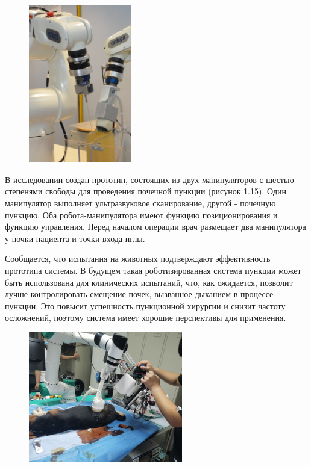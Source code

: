 \begin{figure}[!h]
\begin{center}
\includegraphics[width=0.4\textwidth]{Рисунки/аналог3.png}
\caption{\centering {}}
\label{част}
\end{center}
\end{figure}

В исследовании \cite{litlink42} создан прототип, состоящих из двух манипуляторов с шестью степенями свободы для проведения почечной пункции (рисунок 1.15). Один манипулятор выполняет ультразвуковое сканирование, другой - почечную пункцию. Оба робота-манипулятора имеют функцию позиционирования и функцию управления. Перед началом операции врач размещает два манипулятора у почки пациента и точки входа иглы. 

Сообщается, что испытания на животных подтверждают эффективность прототипа системы.
В будущем такая роботизированная система пункции может быть использована для клинических испытаний, что, как ожидается, позволит лучше контролировать смещение почек, вызванное дыханием в процессе пункции. Это повысит успешность пункционной хирургии и снизит частоту осложнений, поэтому система имеет хорошие перспективы для применения.

\begin{figure}[!h]
\begin{center}
\includegraphics[width=0.6\textwidth]{Рисунки/аналог4.png}
\caption{\centering {}}
\label{част}
\end{center}
\end{figure}
\newpage

